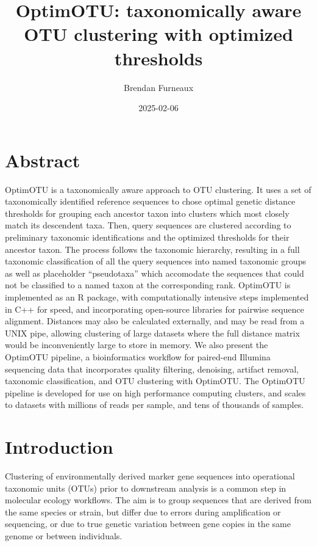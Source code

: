 \documentclass[
]{article}
\title{OptimOTU: taxonomically aware OTU clustering with optimized thresholds}
\author{Brendan Furneaux}
\date{2025-02-06}
\begin{document}
\maketitle

\section{Abstract}\label{abstract}

OptimOTU is a taxonomically aware approach to OTU clustering.
It uses a set of taxonomically identified reference sequences to chose optimal genetic distance thresholds for grouping each ancestor taxon into clusters which most closely match its descendent taxa.
Then, query sequences are clustered according to preliminary taxonomic identifications and the optimized thresholds for their ancestor taxon.
The process follows the taxonomic hierarchy, resulting in a full taxonomic classification of all the query sequences into named taxonomic groups as well as placeholder ``pseudotaxa'' which accomodate the sequences that could not be classified to a named taxon at the corresponding rank.
OptimOTU is implemented as an R package, with computationally intensive steps implemented in C++ for speed, and incorporating open-source libraries for pairwise sequence alignment.
Distances may also be calculated externally, and may be read from a UNIX pipe, allowing clustering of large datasets where the full distance matrix would be inconveniently large to store in memory.
We also present the OptimOTU pipeline, a bioinformatics workflow for paired-end Illumina sequencing data that incorporates quality filtering, denoising, artifact removal, taxonomic classification, and OTU clustering with OptimOTU.
The OptimOTU pipeline is developed for use on high performance computing clusters, and scales to datasets with millions of reads per sample, and tens of thousands of samples.

\section{Introduction}\label{introduction}

Clustering of environmentally derived marker gene sequences into operational taxonomic units (OTUs) prior to downstream analysis is a common step in molecular ecology workflows.
The aim is to group sequences that are derived from the same species or strain, but differ due to errors during amplification or sequencing, or due to true genetic variation between gene copies in the same genome or between individuals.
\end{document}
